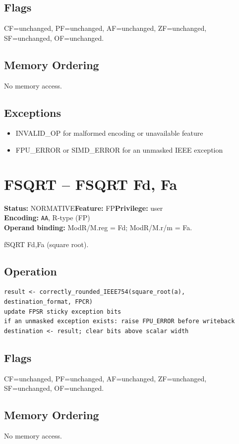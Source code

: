 \documentclass[10pt]{article}
\begin{document}
\subsection*{Flags}
CF=unchanged, PF=unchanged, AF=unchanged, ZF=unchanged, SF=unchanged, OF=unchanged.
\subsection*{Memory Ordering}
No memory access.
\subsection*{Exceptions}
\begin{itemize}
\item INVALID\_OP for malformed encoding or unavailable feature
\item FPU\_ERROR or SIMD\_ERROR for an unmasked IEEE exception
\end{itemize}
\clearpage

\section{FSQRT -- FSQRT Fd, Fa}
\textbf{Status:} NORMATIVE\quad \textbf{Feature:} FP\quad \textbf{Privilege:} user\\
\textbf{Encoding:} \texttt{AA}, R-type (FP)\\
\textbf{Operand binding:} ModR/M.reg = Fd; ModR/M.r/m = Fa.

fSQRT Fd,Fa (square root).

\subsection*{Operation}
\begin{lstlisting}
result <- correctly_rounded_IEEE754(square_root(a), destination_format, FPCR)
update FPSR sticky exception bits
if an unmasked exception exists: raise FPU_ERROR before writeback
destination <- result; clear bits above scalar width
\end{lstlisting}
\subsection*{Flags}
CF=unchanged, PF=unchanged, AF=unchanged, ZF=unchanged, SF=unchanged, OF=unchanged.
\subsection*{Memory Ordering}
No memory access.
\end{document}
